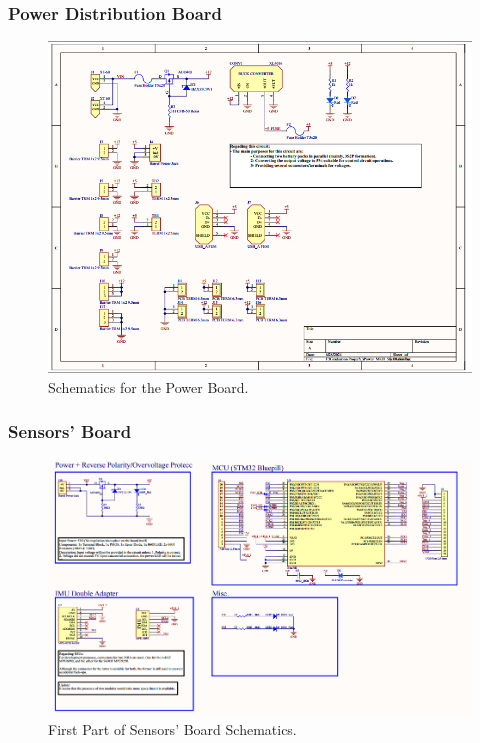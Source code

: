 \subsubsection{Power Distribution Board}
\begin{figure}[h!]
	\centering
	\includegraphics[scale=0.1]{Figures/HW/schem-pwr.png}
	\caption{Schematics for the Power Board. }
	\label{fig:hw-pwr-schem}
\end{figure}

\subsubsection{Sensors' Board}
\begin{figure}[h!]
	\centering
	\includegraphics[scale=0.1]{Figures/HW/schem-sensi-1.png}
	\caption{First Part of Sensors' Board Schematics.}
	\label{fig:hw-sensi-schem-1}
\end{figure}

